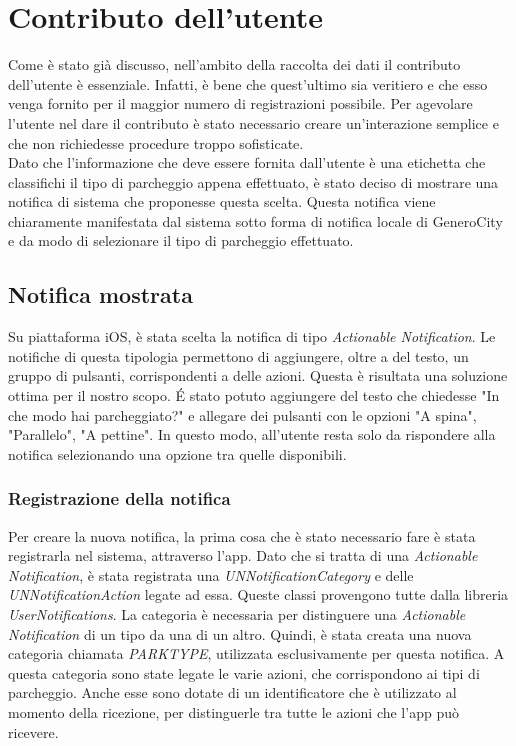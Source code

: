\chapter{Contributo dell'utente}

Come è stato già discusso, nell'ambito della raccolta dei dati il contributo dell'utente
è essenziale. Infatti, è bene che quest'ultimo sia veritiero e che esso venga fornito per
il maggior numero di registrazioni possibile. Per agevolare l'utente nel dare il contributo
è stato necessario creare un'interazione semplice e che non richiedesse procedure troppo 
sofisticate.\\
Dato che l'informazione che deve essere fornita dall'utente è una etichetta che classifichi
il tipo di parcheggio appena effettuato, è stato deciso di mostrare una notifica di sistema
che proponesse questa scelta. Questa notifica viene chiaramente manifestata dal sistema
sotto forma di notifica locale di GeneroCity e da modo di selezionare il tipo di parcheggio
effettuato.

\section{Notifica mostrata}

Su piattaforma iOS, è stata scelta la notifica di tipo \emph{Actionable Notification}.
Le notifiche di questa tipologia permettono di aggiungere, oltre a del testo, un gruppo 
di pulsanti, corrispondenti a delle azioni. Questa è risultata una soluzione ottima per 
il nostro scopo. \'E stato potuto aggiungere del testo che chiedesse "In che modo hai
parcheggiato?" e allegare dei pulsanti con le opzioni "A spina", "Parallelo", "A pettine".
In questo modo, all'utente resta solo da rispondere alla notifica selezionando una 
opzione tra quelle disponibili.

\subsection{Registrazione della notifica}

Per creare la nuova notifica, la prima cosa che è stato necessario fare è stata registrarla
nel sistema, attraverso l'app. Dato che si tratta di una \emph{Actionable Notification},
è stata registrata una \emph{UNNotificationCategory} e delle \emph{UNNotificationAction}
legate ad essa. Queste classi provengono tutte dalla libreria \emph{UserNotifications}. 
La categoria è necessaria per distinguere una \emph{Actionable Notification}
di un tipo da una di un altro. Quindi, è stata creata una nuova categoria chiamata 
\emph{PARKTYPE}, utilizzata esclusivamente per questa notifica. A questa categoria sono 
state legate le varie azioni, che corrispondono ai tipi di parcheggio. Anche esse sono
dotate di un identificatore che è utilizzato al momento della ricezione, per distinguerle
tra tutte le azioni che l'app può ricevere.

